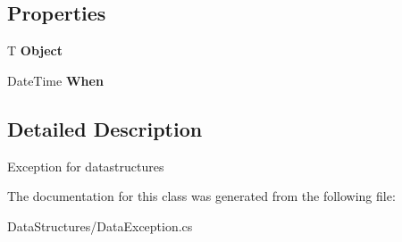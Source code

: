 \subsection*{Properties}
\begin{DoxyCompactItemize}
\item 
\hypertarget{class_dwarf_d_b_1_1_data_structures_1_1_data_exception_3_01_t_01_4_a0ac0e2172d354ec3554b28959a9b7772}{T {\bfseries Object}}\label{class_dwarf_d_b_1_1_data_structures_1_1_data_exception_3_01_t_01_4_a0ac0e2172d354ec3554b28959a9b7772}

\item 
\hypertarget{class_dwarf_d_b_1_1_data_structures_1_1_data_exception_3_01_t_01_4_a4d68408ff2bb7810d4ece2764efc1d1c}{Date\+Time {\bfseries When}}\label{class_dwarf_d_b_1_1_data_structures_1_1_data_exception_3_01_t_01_4_a4d68408ff2bb7810d4ece2764efc1d1c}

\end{DoxyCompactItemize}


\subsection{Detailed Description}
Exception for datastructures 



The documentation for this class was generated from the following file\+:\begin{DoxyCompactItemize}
\item 
Data\+Structures/Data\+Exception.\+cs\end{DoxyCompactItemize}

